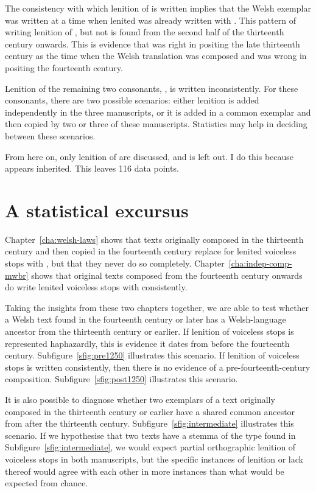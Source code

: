 The consistency with which lenition of  is written implies that the Welsh exemplar was written at a time when lenited  was already written with . This pattern of writing lenition of , but not  is found from the second half of the thirteenth century onwards. This is evidence that \textcite{Rob_Ystoriaeu11} was right in positing the late thirteenth century as the time when the Welsh translation was composed and \textcite{Eva_Welsh88} was wrong in positing the fourteenth century.

Lenition of the remaining two consonants, , is written inconsistently. For these consonants, there are two possible scenarios: either lenition is added independently in the three manuscripts, or it is added in a common exemplar and then copied by two or three of these manuscripts. Statistics may help in deciding between these scenarios.

From here on, only lenition of  are discussed, and  is left out. I do this because  appears inherited. This leaves 116 data points.

\section{A statistical excursus}
\label{sec:statistical-excursus}

Chapter~\ref{cha:welsh-laws} shows that texts originally composed in the thirteenth century and then copied in the fourteenth century replace  for lenited voiceless stops with , but that they never do so completely. Chapter~\ref{cha:indep-comp-mwbr} shows that original texts composed from the fourteenth century onwards do write lenited voiceless stops with  consistently.

Taking the insights from these two chapters together, we are able to test whether a Welsh text found in the fourteenth century or later has a Welsh-language ancestor from the thirteenth century or earlier. If lenition of voiceless stops is represented haphazardly, this is evidence it dates from before the fourteenth century. Subfigure~\ref{sfig:pre1250} illustrates this scenario. If lenition of voiceless stops is written consistently, then there is no evidence of a pre-fourteenth-century composition. Subfigure~\ref{sfig:post1250} illustrates this scenario.

It is also possible to diagnose whether two exemplars of a text originally composed in the thirteenth century or earlier have a shared common ancestor from after the thirteenth century. Subfigure~\ref{sfig:intermediate} illustrates this scenario. If we hypothesise that two texts have a stemma of the type found in Subfigure~\ref{sfig:intermediate}, we would expect partial orthographic lenition of voiceless stops in both manuscripts, but the specific instances of lenition or lack thereof would agree with each other in more instances than what would be expected from chance.

